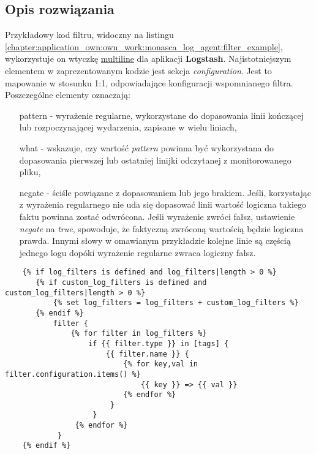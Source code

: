     \subsection{Opis rozwiązania}
    Przykładowy kod filtru, widoczny na listingu \ref{chapter:application_own:own_work:monasca_log_agent:filter_example}, 
    wykorzystuje on wtyczkę \href{https://www.elastic.co/guide/en/logstash/current/plugins-filters-multiline.html}{multiline} 
    dla aplikacji \textbf{Logstash}. Najistotniejszym elementem w zaprezentowanym kodzie jest sekcja 
    \textit{configuration}. Jest to mapowanie w stosunku 1:1, odpowiadające konfiguracji wspomnianego filtra. Poszczególne 
    elementy oznaczają:
    \begin{itemize}
        \item[pattern] - wyrażenie regularne, wykorzystane do dopasowania linii kończącej lub rozpoczynającej wydarzenia, zapisane w wielu liniach,
        \item[what] - wskazuje, czy wartość \textit{pattern} powinna być wykorzystana do dopasowania pierwszej lub ostatniej linijki odczytanej
        z monitorowanego pliku,
        \item[negate] - ściśle powiązane z dopasowaniem lub jego brakiem. Jeśli, korzystając z wyrażenia regularnego nie uda się dopasować linii
        wartość logiczna takiego faktu powinna zostać odwrócona. Jeśli wyrażenie zwróci fałsz, ustawienie \textit{negate} na \textit{true}, 
        spowoduje, że faktyczną zwróconą wartością będzie logiczna prawda. Innymi słowy w omawianym przykładzie kolejne linie są częścią jednego
        logu dopóki wyrażenie regularne zwraca logiczny fałsz. 
    \end{itemize}
    
    \begin{listing}[H]
        \begin{verbatim}
    {% if log_filters is defined and log_filters|length > 0 %}
       {% if custom_log_filters is defined and custom_log_filters|length > 0 %}
           {% set log_filters = log_filters + custom_log_filters %}
       {% endif %}
           filter {
               {% for filter in log_filters %}
                   if {{ filter.type }} in [tags] {
                       {{ filter.name }} {
                           {% for key,val in filter.configuration.items() %}
                               {{ key }} => {{ val }}
                           {% endfor %}
                        }
                    }
                {% endfor %}
            }
    {% endif %}
        \end{verbatim}
        \caption[Wpisanie filtrów do pliku konfiguracyjnego \textbf{Logstash}]{
            Wpisanie filtrów do pliku konfiguracyjnego \textbf{Logstash}, źródło: \url{https://github.com/FujitsuEnablingSoftwareTechnologyGmbH/ansible-monasca-log-agent/blob/master/templates/agent.conf.j2}}
        \label{chapter:application_own:own_work:monasca_log_agent:filter_applying}
    \end{listing}
    

